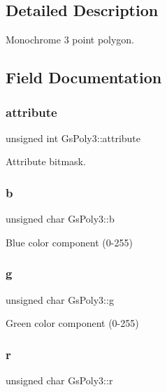\subsection{Detailed Description}
Monochrome 3 point polygon. 

\subsection{Field Documentation}
\mbox{\label{structGsPoly3_af984f057fe145257779d682611a506ca}} 
\subsubsection{\texorpdfstring{attribute}{attribute}}
{\footnotesize\ttfamily unsigned int Gs\+Poly3\+::attribute}



Attribute bitmask. 

\mbox{\label{structGsPoly3_a5fd31be0e0f4318c79eba5f6b0fbf407}} 
\subsubsection{\texorpdfstring{b}{b}}
{\footnotesize\ttfamily unsigned char Gs\+Poly3\+::b}



Blue color component (0-\/255) 

\mbox{\label{structGsPoly3_a22f16d37acb1952cac431d182640383a}} 
\subsubsection{\texorpdfstring{g}{g}}
{\footnotesize\ttfamily unsigned char Gs\+Poly3\+::g}



Green color component (0-\/255) 

\mbox{\label{structGsPoly3_ad6e5d6f90f65bb68d79afcc618aa0561}} 
\subsubsection{\texorpdfstring{r}{r}}
{\footnotesize\ttfamily unsigned char Gs\+Poly3\+::r}



